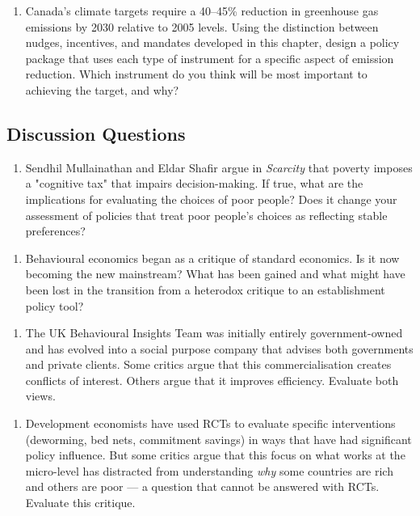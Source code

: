\documentclass[12pt, letterpaper]{article}
\begin{document}
\begin{enumerate}
\item Canada's climate targets require a 40--45\% reduction in greenhouse gas emissions by 2030 relative to 2005 levels. Using the distinction between nudges, incentives, and mandates developed in this chapter, design a policy package that uses each type of instrument for a specific aspect of emission reduction. Which instrument do you think will be most important to achieving the target, and why?
\end{enumerate}


\subsection{Discussion Questions}


\begin{enumerate}
\item Sendhil Mullainathan and Eldar Shafir argue in \textit{Scarcity} that poverty imposes a "cognitive tax" that impairs decision-making. If true, what are the implications for evaluating the choices of poor people? Does it change your assessment of policies that treat poor people's choices as reflecting stable preferences?
\end{enumerate}

\begin{enumerate}
\item Behavioural economics began as a critique of standard economics. Is it now becoming the new mainstream? What has been gained and what might have been lost in the transition from a heterodox critique to an establishment policy tool?
\end{enumerate}

\begin{enumerate}
\item The UK Behavioural Insights Team was initially entirely government-owned and has evolved into a social purpose company that advises both governments and private clients. Some critics argue that this commercialisation creates conflicts of interest. Others argue that it improves efficiency. Evaluate both views.
\end{enumerate}

\begin{enumerate}
\item Development economists have used RCTs to evaluate specific interventions (deworming, bed nets, commitment savings) in ways that have had significant policy influence. But some critics argue that this focus on what works at the micro-level has distracted from understanding \textit{why} some countries are rich and others are poor --- a question that cannot be answered with RCTs. Evaluate this critique.
\end{enumerate}
\end{document}
